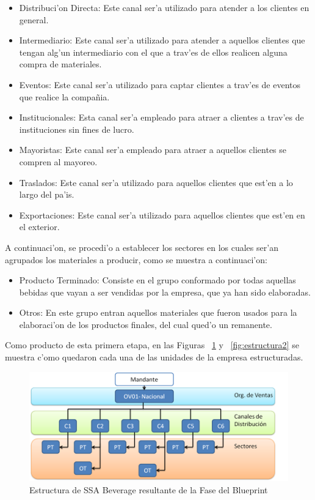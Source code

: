 \begin{itemize}
\item Distribuci'on Directa: Este canal ser'a utilizado para atender a los clientes en general.
\item Intermediario: Este canal ser'a utilizado para atender a aquellos clientes que tengan alg'un intermediario con el que a trav'es de ellos realicen alguna compra de materiales.
\item Eventos: Este canal ser'a utilizado para captar clientes a trav'es de eventos que realice la compa\~nia. 
\item Institucionales: Esta canal ser'a empleado para atraer a clientes a trav'es de instituciones sin fines de lucro.
\item Mayoristas: Este canal ser'a empleado para atraer a aquellos clientes se compren al mayoreo.
\item Traslados: Este canal ser'a utilizado para aquellos clientes que est'en a lo largo del pa'is.
\item Exportaciones: Este canal ser'a utilizado para aquellos clientes que est'en en el exterior.
\end{itemize}
	A continuaci'on, se procedi'o a establecer los sectores en los cuales ser'an agrupados los materiales a producir, como se muestra a continuaci'on:
\begin{itemize}
\item Producto Terminado: Consiste en el grupo conformado por todas aquellas bebidas que vayan a ser vendidas por la empresa, que ya han sido elaboradas.
\item Otros: En este grupo entran aquellos materiales que fueron usados para la elaboraci'on de los productos finales, del cual qued'o un remanente.
\end{itemize}
	Como producto de esta primera etapa, en las Figuras ~\ref{fig:estructura1} y ~\ref{fig:estructura2} se muestra c'omo quedaron cada una de las unidades de la empresa estructuradas.
\begin{figure}[H]
\centering
\includegraphics[scale=0.65,type=png,ext=.png,read=.png]{figures/Org1}
\caption{Estructura de SSA Beverage resultante de la Fase del Blueprint}
\label{fig:estructura1}
\end{figure}
